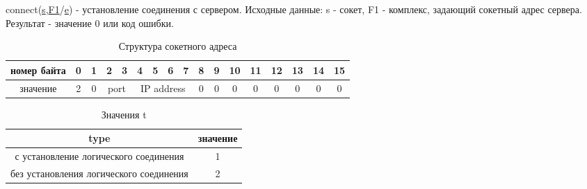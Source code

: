 \documentclass[12t,english,russian]{article}
\begin{document}
\label{connect}
connect(\hyperref[socket]{s},\hyperref[sockaddr]{F1}/\hyperref[error]{e}) - установление соединения с сервером. Исходные данные: s - сокет, F1 - комплекс, задающий сокетный адрес сервера. Результат - значение 0 или код ошибки.

\begin{table}[H]
\caption{\label{sockaddr}Структура сокетного адреса}
\begin{center}
\begin{tabular}{|c|c|c|c|c|c|c|c|c|c|c|c|c|c|c|c|c|}
\hline
номер байта & 0 & 1 & 2 & 3 & 4 & 5 & 6 & 7 & 8 & 9 & 10 & 11 & 12 & 13 & 14 & 15 \\
\hline
значение & 2 & 0 & \multicolumn{2}{|c|}{port} & \multicolumn{4}{|c|}{IP address} & 0 & 0 & 0 & 0 & 0 & 0 & 0 & 0 \\
\hline
\end{tabular}
\end{center}
\end{table}

\begin{table}[ht]
\caption{\label{type}Значения t}
\begin{center}
\begin{tabular}{|c|c|}
\hline
type & значение \\
\hline
с установление логического соединения & 1 \\
без установления логического соединения & 2 \\
\hline
\end{tabular}
\end{center}
\end{table}
\end{document}
